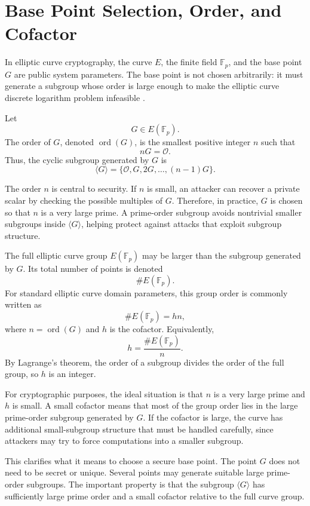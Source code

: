 \documentclass[12pt,a4paper]{article}
\begin{document}
\section{Base Point Selection, Order, and Cofactor}

In elliptic curve cryptography, the curve \(E\), the finite field \(\mathbb{F}_p\), and the base point \(G\) are public system parameters. The base point is not chosen arbitrarily: it must generate a subgroup whose order is large enough to make the elliptic curve discrete logarithm problem infeasible \cite{trappe-washington2006,nist800186}.

Let
\[G\in E(\mathbb{F}_p).\]
The order of \(G\), denoted \(\operatorname{ord}(G)\), is the smallest positive integer \(n\) such that
\[nG=\mathcal{O}.\]
Thus, the cyclic subgroup generated by \(G\) is
\[\langle G\rangle=\{\mathcal{O},G,2G,\ldots,(n-1)G\}.\]

The order \(n\) is central to security. If \(n\) is small, an attacker can recover a private scalar by checking the possible multiples of \(G\). Therefore, in practice, \(G\) is chosen so that \(n\) is a very large prime. A prime-order subgroup avoids nontrivial smaller subgroups inside \(\langle G\rangle\), helping protect against attacks that exploit subgroup structure.

The full elliptic curve group \(E(\mathbb{F}_p)\) may be larger than the subgroup generated by \(G\). Its total number of points is denoted
\[\#E(\mathbb{F}_p).\]
For standard elliptic curve domain parameters, this group order is commonly written as
\[\#E(\mathbb{F}_p)=hn,\]
where \(n=\operatorname{ord}(G)\) and \(h\) is the cofactor. Equivalently,
\[h=\frac{\#E(\mathbb{F}_p)}{n}.\]
By Lagrange's theorem, the order of a subgroup divides the order of the full group, so \(h\) is an integer.

For cryptographic purposes, the ideal situation is that \(n\) is a very large prime and \(h\) is small. A small cofactor means that most of the group order lies in the large prime-order subgroup generated by \(G\). If the cofactor is large, the curve has additional small-subgroup structure that must be handled carefully, since attackers may try to force computations into a smaller subgroup.

This clarifies what it means to choose a secure base point. The point \(G\) does not need to be secret or unique. Several points may generate suitable large prime-order subgroups. The important property is that the subgroup \(\langle G\rangle\) has sufficiently large prime order and a small cofactor relative to the full curve group.
\end{document}
